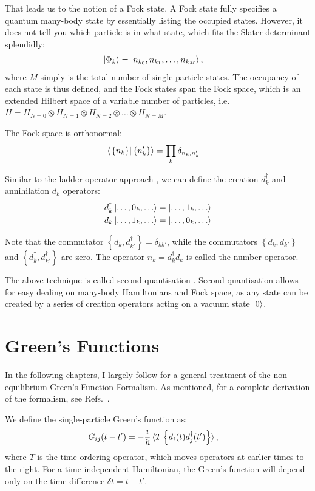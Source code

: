 That leads us to the notion of a Fock state. A Fock state fully specifies a quantum many-body state by essentially listing the occupied states. However, it does not tell you which particle is in what state, which fits the Slater determinant splendidly:
\begin{align}
\ket{\Phi_k} &= \ket{n_{k_0}, n_{k_1},\ldots, n_{k_M}},
\label{eq:fock}
\end{align}
where $M$ simply is the total number of single-particle states. The occupancy of each state is thus defined, and the Fock states span the Fock space, which is an extended Hilbert space of a variable number of particles, i.e. $H = H_{N=0} \otimes H_{N=1} \otimes H_{N=2}\otimes \ldots \otimes H_{N=M}$. 

The Fock space is orthonormal:
\begin{align*}
\braket{ \left. \left\{ n_k \right\} \right| \left\{ n_k' \right\}} &= \prod_{k} \delta_{n_k, n_k'}
\end{align*}

Similar to the ladder operator approach \cite{griffiths}, we can define the creation $d^\dagger_k$ and annihilation $d_k$ operators:
\begin{align*}
d_k^\dagger \ket{\ldots, 0_k, \ldots} &=\ket{\ldots, 1_k, \ldots}\\
d_k \ket{\ldots, 1_k, \ldots} &=\ket{\ldots, 0_k, \ldots}
\end{align*}

Note that the commutator $\left\{ d_k, d_{k'}^\dagger\right\} = \delta_{kk'}$, while the commutators $\left\{ d_k, d_{k'}\right\}$ and $\left\{ d_k^\dagger, d_{k'}^\dagger\right\}$ are zero. The operator $n_k = d_k^\dagger d_k$ is called the number operator. 

The above technique is called second quantisation \cite{yuli}. Second quantisation allows for easy dealing on many-body Hamiltonians and Fock space, as any state can be created by a series of creation operators acting on a vacuum state $\ket{0}$. 
 

\section{Green's Functions}
\label{sec:greensfunctions}
In the following chapters, I largely follow \citet{seldenthuis} for a general treatment of the non-equilibrium Green's Function Formalism. As mentioned, for a complete derivation of the formalism, see Refs.~\cite{mattuck,diventra,haugjauho}.

We define the single-particle Green's function as:
\begin{align}
G_{ij} (t-t') &= -\frac{\imath}{\hslash} \braket{ T\left\{d_i(t)d_j^\dagger(t')\right\}},
\label{eq:greensfunction}
\end{align}
where $T$ is the time-ordering operator, which moves operators at earlier times to the right. For a time-independent Hamiltonian, the Green's function will depend only on the time difference $\delta t = t - t'$. 

